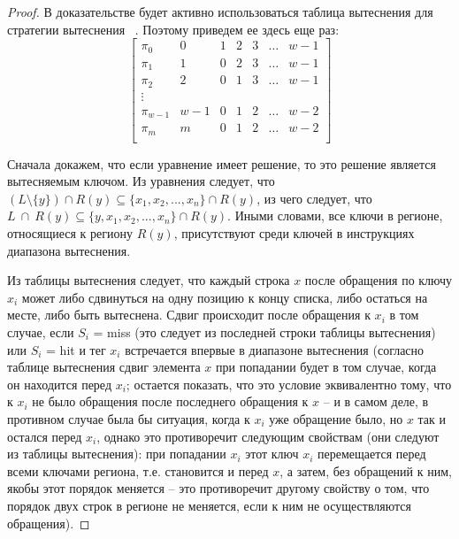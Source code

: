 \theoremtext{\ref{LRU_equation}}{\DiapazonLRU}
\begin{proof}
  В доказательстве будет активно использоваться таблица вытеснения
  для стратегии вытеснения \LRU~\cite{policy_tables}. Поэтому
  приведем ее здесь еще раз:
  $$
  \left[
    \begin{array}{c|cccccc}
      \pi_0 & 0 & 1 & 2 & 3 & \dots & w{-}1 \\
      \pi_1 & 1 & 0 & 2 & 3 & \dots & w{-}1 \\
      \pi_2 & 2 & 0 & 1 & 3 & \dots & w{-}1 \\
      \vdots &  &  &  & & & \\
      \pi_{w-1} & w{-}1 & 0 & 1 & 2 & \dots & w{-}2 \\
      \pi_m & m & 0 & 1 & 2 & \dots & w{-}2 \\
    \end{array}
  \right]
  $$

  Сначала докажем, что если уравнение имеет решение, то это решение
  является вытесняемым ключом. Из уравнения следует, что
  $(L\setminus\{y\}) \cap R(y) \subseteq \{x_1, x_2, ..., x_n\} \cap
  R(y)$, из чего следует, что $L~\cap~R(y) \subseteq \{y, x_1, x_2,
  ..., x_n\} \cap R(y)$. Иными словами, все ключи в регионе, относящиеся
  к региону $R(y)$, присутствуют среди ключей в инструкциях диапазона вытеснения.

  Из таблицы вытеснения следует, что каждый строка $x$ после
  обращения по ключу $x_i$ может либо сдвинуться на одну позицию к
  концу списка, либо остаться на месте, либо быть вытеснена. Сдвиг
  происходит после обращения к $x_i$ в том случае, если $S_i$ = miss
  (это следует из последней строки таблицы вытеснения) или $S_i$ = hit
   и тег $x_i$ встречается впервые в диапазоне вытеснения (согласно таблице
  вытеснения сдвиг элемента $x$ при попадании будет в том случае, когда
  он находится перед $x_i$; остается показать, что это условие
  эквивалентно тому, что к $x_i$ не было обращения после последнего
  обращения к $x$ -- и в самом деле, в противном случае была бы
  ситуация, когда к $x_i$ уже обращение было, но $x$ так и остался
  перед $x_i$, однако это противоречит следующим свойствам (они
  следуют из таблицы вытеснения): при попадании $x_i$ этот ключ
  $x_i$ перемещается перед всеми ключами региона, т.е. становится и перед $x$, а затем, без обращений к ним, якобы этот порядок меняется -- это противоречит другому
  свойству о том, что порядок двух строк в регионе не меняется, если
  к ним не осуществляются обращения).


\end{proof}
